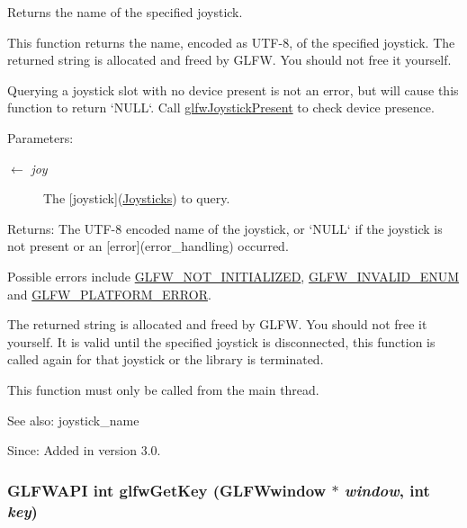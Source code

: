 Returns the name of the specified joystick. 

This function returns the name, encoded as UTF-8, of the specified joystick. The returned string is allocated and freed by GLFW. You should not free it yourself.

Querying a joystick slot with no device present is not an error, but will cause this function to return `NULL`. Call \hyperlink{group__input_g7f81f22f355f4b7d315caf73cdfd9906}{glfwJoystickPresent} to check device presence.

\begin{Desc}
\item[Parameters:]
\begin{description}
\item[\mbox{$\leftarrow$} {\em joy}]The \mbox{[}joystick\mbox{]}(\hyperlink{group__joysticks}{Joysticks}) to query. \end{description}
\end{Desc}
\begin{Desc}
\item[Returns:]The UTF-8 encoded name of the joystick, or `NULL` if the joystick is not present or an \mbox{[}error\mbox{]}(error\_\-handling) occurred.\end{Desc}
Possible errors include \hyperlink{group__errors_g2374ee02c177f12e1fa76ff3ed15e14a}{GLFW\_\-NOT\_\-INITIALIZED}, \hyperlink{group__errors_g76f6bb9c4eea73db675f096b404593ce}{GLFW\_\-INVALID\_\-ENUM} and \hyperlink{group__errors_gd44162d78100ea5e87cdd38426b8c7a1}{GLFW\_\-PLATFORM\_\-ERROR}.

The returned string is allocated and freed by GLFW. You should not free it yourself. It is valid until the specified joystick is disconnected, this function is called again for that joystick or the library is terminated.

This function must only be called from the main thread.

\begin{Desc}
\item[See also:]joystick\_\-name\end{Desc}
\begin{Desc}
\item[Since:]Added in version 3.0. \end{Desc}
\hypertarget{group__input_g7d8ad8ffaf272808f04e1d5d33ec8859}{
\subsubsection[glfwGetKey]{\setlength{\rightskip}{0pt plus 5cm}GLFWAPI int glfwGetKey ({\bf GLFWwindow} $\ast$ {\em window}, \/  int {\em key})}}
\label{group__input_g7d8ad8ffaf272808f04e1d5d33ec8859}


